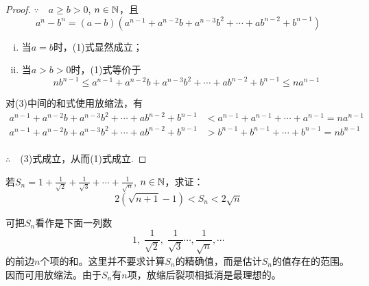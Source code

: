 \begin{proof}
    $\because\quad a\ge b>0$, $n\in\mathbb{N}$，且
\begin{equation}
    a^n-b^n=(a-b)(a^{n-1}+a^{n-2}b+a^{n-3}b^2+\cdots+ab^{n-2}+b^{n-1})  \tag{2}
\end{equation}
\begin{enumerate}[(i)]
\item 当$a=b$时，(1)式显然成立；
\item 当$a>b>0$时，(1)式等价于
\begin{equation}
nb^{n-1}\le a^{n-1}+a^{n-2}b+a^{n-3}b^2+\cdots+ab^{n-2}+b^{n-1}\le na^{n-1}\tag{3}
\end{equation}
\end{enumerate}
对(3)中间的和式使用放缩法，有
\[\begin{split}
    a^{n-1}+a^{n-2}b+a^{n-3}b^2+\cdots+ab^{n-2}+b^{n-1}&<a^{n-1}+a^{n-1}+\cdots+a^{n-1}=na^{n-1}\\
    a^{n-1}+a^{n-2}b+a^{n-3}b^2+\cdots+ab^{n-2}+b^{n-1}&>b^{n-1}+b^{n-1}+\cdots+b^{n-1}=nb^{n-1}\\
\end{split}\]

$\therefore\quad $(3)式成立，从而(1)式成立.
\end{proof}

\begin{example}
若$S_n=1+\frac{1}{\sqrt{2}}+\frac{1}{\sqrt{3}}+\cdots+\frac{1}{\sqrt{n}}$, $n\in\mathbb{N}$，求证：
\[2\left(\sqrt{n+1}-1\right)<S_n<2\sqrt{n}\]
\end{example}

\begin{analyze}
可把$S_n$看作是下面一列数
\[1,\; \frac{1}{\sqrt{2}},\; \frac{1}{\sqrt{3}}\cdots,  \frac{1}{\sqrt{n}}, \cdots\]
的前边$n$个项的和。这里并不要求计算$S_n$的精确值，而是估计$S_n$的值存在的范围。因而可用放缩法。由于$S_n$有$n$项，放缩后裂项相抵消是最理想的。
\end{analyze}

